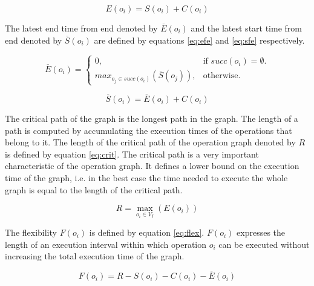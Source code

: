\begin{equation}
	E(o_i)=S(o_i)+C(o_i) 
	\label{eq:efs}
\end{equation}

The latest end time from end denoted by $\overline{E}(o_i)$ and the latest start time from end denoted by $\overline{S}(o_i)$ are defined by equations \ref{eq:efe} and \ref{eq:sfe} respectively. %

\begin{equation}
\overline{E}(o_i)=\begin{cases}
    0, & \text{if $succ(o_i)=\emptyset$}.\\
    max_{o_j \in succ(o_i)}(\overline{S}(o_j)), & \text{otherwise}.
  \end{cases}
	\label{eq:efe}
\end{equation}

\begin{equation}
	\overline{S}(o_i)=\overline{E}(o_i)+C(o_i) 
	\label{eq:sfe}
\end{equation}

The critical path of the graph is the longest path in the graph. The length of a path is computed by accumulating the execution times of the operations that belong to it. The length of the critical path of the operation graph denoted by $R$ is defined by equation \ref{eq:crit}. The critical path is a very important characteristic of the operation graph. It defines a lower bound on the execution time of the graph, i.e. in the best case the time needed to execute the whole graph is equal to the length of the critical path. 

\begin{equation}
	R = \max_{o_i \in V_I}(E(o_i)) 
	\label{eq:crit}
\end{equation}
 
The flexibility $F(o_i)$ is defined by equation \ref{eq:flex}. $F(o_i)$ expresses the length of an execution interval within which operation $o_i$ can be executed without increasing the total execution time of the graph.

\begin{equation}
	F(o_i) = R - S(o_i) - C(o_i) - \overline{E}(o_i) 
	\label{eq:flex}
\end{equation}


